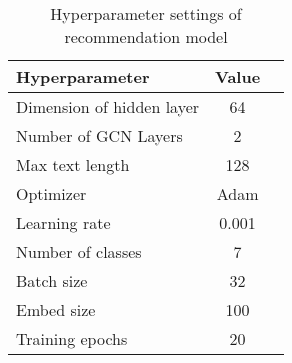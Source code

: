 \begin{table}[htb]
    \caption{Hyperparameter settings of recommendation model}\label{tbl:ch2-hpsetting}
    \centering
    \begin{tabular}{l c c}
        \toprule
        Hyperparameter            & Value \\
        \midrule
        Dimension of hidden layer & 64    \\
        Number of GCN Layers      & 2     \\
        Max text length           & 128   \\
        Optimizer                 & Adam  \\
        Learning rate             & 0.001 \\
        Number of classes         & 7     \\
        Batch size                & 32    \\
        Embed size                & 100   \\
        Training epochs           & 20    \\
        \midrule
        \bottomrule
    \end{tabular}
\end{table}





